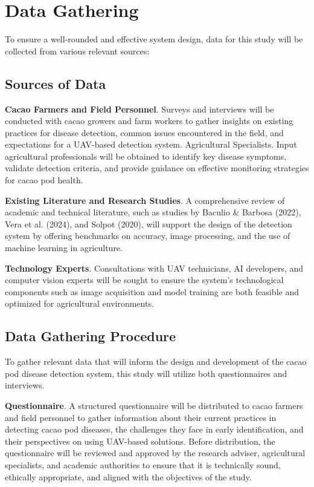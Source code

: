 \section{Data Gathering}
To ensure a well-rounded and effective system design, data for this study will be collected from various relevant sources:

\subsection*{Sources of Data}
\textbf{Cacao Farmers and Field Personnel}. Surveys and interviews will be conducted with cacao growers and farm workers to gather insights on existing practices for disease detection, common issues encountered in the field, and expectations for a UAV-based detection system. Agricultural Specialists. Input agricultural professionals will be obtained to identify key disease symptoms, validate detection criteria, and provide guidance on effective monitoring strategies for cacao pod health.

\textbf{Existing Literature and Research Studies}. A comprehensive review of academic and technical literature, such as studies by Baculio \& Barbosa (2022), Vera et al. (2024), and Solpot (2020), will support the design of the detection system by offering benchmarks on accuracy, image processing, and the use of machine learning in agriculture.

\textbf{Technology Experts}. Consultations with UAV technicians, AI developers, and computer vision experts will be sought to ensure the system’s technological components such as image acquisition and model training are both feasible and optimized for agricultural environments.

\subsection*{Data Gathering Procedure}

To gather relevant data that will inform the design and development of the cacao pod disease detection system, this study will utilize both questionnaires and interviews.

\textbf{Questionnaire}. A structured questionnaire will be distributed to cacao farmers and field personnel to gather information about their current practices in detecting cacao pod diseases, the challenges they face in early identification, and their perspectives on using UAV-based solutions. Before distribution, the questionnaire will be reviewed and approved by the research adviser, agricultural specialists, and academic authorities to ensure that it is technically sound, ethically appropriate, and aligned with the objectives of the study.

